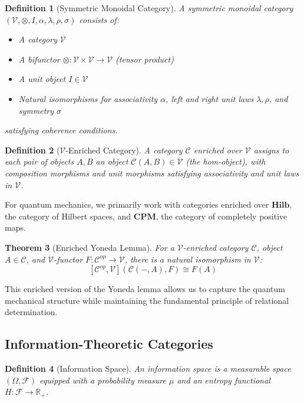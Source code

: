\documentclass[12pt,a4paper]{article}
\newtheorem{theorem}{Theorem}[section]
\newtheorem{definition}[theorem]{Definition}
\begin{document}
\begin{definition}[Symmetric Monoidal Category]
A symmetric monoidal category $(\mathcal{V}, \otimes, I, \alpha, \lambda, \rho, \sigma)$ consists of:
\begin{itemize}
\item A category $\mathcal{V}$
\item A bifunctor $\otimes: \mathcal{V} \times \mathcal{V} \to \mathcal{V}$ (tensor product)
\item A unit object $I \in \mathcal{V}$
\item Natural isomorphisms for associativity $\alpha$, left and right unit laws $\lambda, \rho$, and symmetry $\sigma$
\end{itemize}
satisfying coherence conditions.
\end{definition}

\begin{definition}[$\mathcal{V}$-Enriched Category]
A category $\mathcal{C}$ enriched over $\mathcal{V}$ assigns to each pair of objects $A, B$ an object $\mathcal{C}(A, B) \in \mathcal{V}$ (the hom-object), with composition morphisms and unit morphisms satisfying associativity and unit laws in $\mathcal{V}$.
\end{definition}

For quantum mechanics, we primarily work with categories enriched over $\mathbf{Hilb}$, the category of Hilbert spaces, and $\mathbf{CPM}$, the category of completely positive maps.

\begin{theorem}[Enriched Yoneda Lemma]
For a $\mathcal{V}$-enriched category $\mathcal{C}$, object $A \in \mathcal{C}$, and $\mathcal{V}$-functor $F: \mathcal{C}^{op} \to \mathcal{V}$, there is a natural isomorphism in $\mathcal{V}$:
\[
[\mathcal{C}^{op}, \mathcal{V}](\mathcal{C}(-, A), F) \cong F(A)
\]
\end{theorem}

This enriched version of the Yoneda lemma allows us to capture the quantum mechanical structure while maintaining the fundamental principle of relational determination.

\subsection{Information-Theoretic Categories}

\begin{definition}[Information Space]
An information space is a measurable space $(\Omega, \mathcal{F})$ equipped with a probability measure $\mu$ and an entropy functional $H: \mathcal{F} \to \mathbb{R}_+$.
\end{definition}
\end{document}
